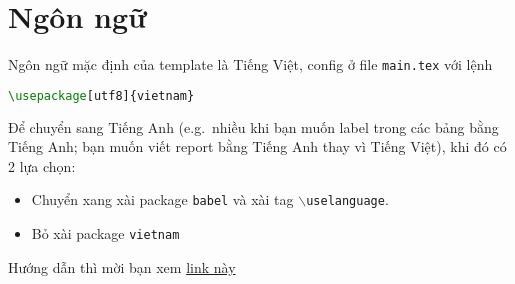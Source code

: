 \section{Ngôn ngữ}
Ngôn ngữ mặc định của template là Tiếng Việt, config ở file \texttt{main.tex} với lệnh
\begin{lstlisting}[language=tex]
\usepackage[utf8]{vietnam}
\end{lstlisting}
Để chuyển sang Tiếng Anh (e.g.\ nhiều khi bạn muốn label trong các bảng bằng Tiếng Anh; bạn muốn viết report bằng Tiếng Anh thay vì Tiếng Việt), khi đó có 2 lựa chọn:
\begin{itemize}
    \item Chuyển xang xài package \texttt{babel} và xài tag \texttt{$\backslash$uselanguage}.
    \item Bỏ xài package \texttt{vietnam}
\end{itemize}
Hướng dẫn thì mời bạn xem \href{https://www.overleaf.com/learn/latex/International_language_support#Babel}{link này}